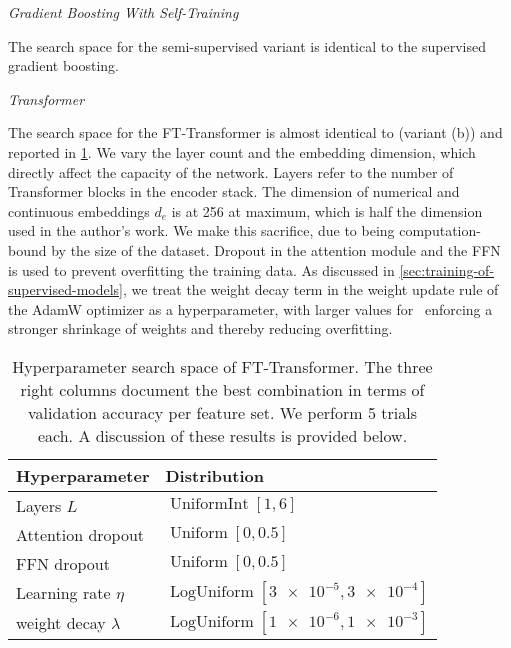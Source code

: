 \emph{Gradient Boosting With Self-Training}

The search space for the semi-supervised variant is identical to the supervised gradient boosting.

\emph{Transformer}

The search space for the FT-Transformer is almost identical to \textcite[][18]{gorishniyRevisitingDeepLearning2021} (variant (b)) and reported in \cref{tab:hyperparameter-space-2}. We vary the layer count and the embedding dimension, which directly affect the capacity of the network. Layers refer to the number of Transformer blocks in the encoder stack. The dimension of numerical and continuous embeddings $d_e$ is at \num{256} at maximum, which is half the dimension used in the author's work. We make this sacrifice, due to being computation-bound by the size of the dataset. Dropout \autocite[][1930]{srivastavaDropoutSimpleWay} in the attention module and the \gls{FFN} is used to prevent overfitting the training data. As discussed in \cref{sec:training-of-supervised-models}, we treat the weight decay term in the weight update rule of the AdamW optimizer as a hyperparameter, with larger values for \lambda~enforcing a stronger shrinkage of weights and thereby reducing overfitting.

\begin{table}[H]
    \centering
    \caption[Hyperparameter Search Space of FT-Transformer]{Hyperparameter search space of FT-Transformer. The three right columns document the best combination in terms of validation accuracy per feature set. We perform \num{5} trials each. A discussion of these results is provided below.}
    \label{tab:hyperparameter-space-2}
    \begin{tabular}{@{}ll@{}}
        \toprule
        Hyperparameter         & Distribution                                        \\ \midrule
        Layers $L$             & $\operatorname{UniformInt}[1,6]$                    \\
        Attention dropout      & $\operatorname{Uniform}[0, 0.5]$                    \\
        \gls{FFN} dropout      & $\operatorname{Uniform}[0, 0.5]$                    \\
        Learning rate $\eta$   & $\operatorname{LogUniform}[\num{3e-5}, \num{3e-4}]$ \\
        weight decay $\lambda$ & $\operatorname{LogUniform}[\num{1e-6}, \num{1e-3}]$ \\ \bottomrule
    \end{tabular}
\end{table}

